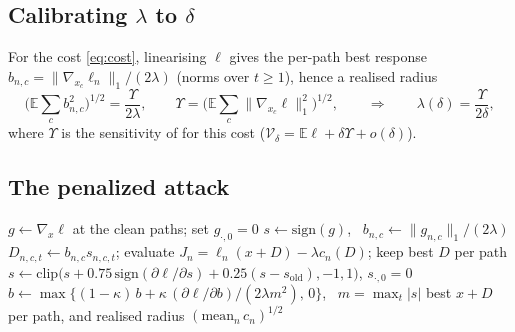 \documentclass[11pt]{article}
\newif\ifshowguides
\newcommand{\guide}[1]{\ifshowguides
  \par\smallskip\noindent\fcolorbox{gray!50}{gray!6}{\parbox{\dimexpr\linewidth-2\fboxsep-2\fboxrule}{\small\itshape\color{gray!80!black}#1}}\par\smallskip\fi}
\newcommand{\E}{\mathbb{E}}
\newcommand{\Ups}{\Upsilon}
\begin{document}
\subsection{Calibrating $\lambda$ to $\delta$}
For the cost \eqref{eq:cost}, linearising $\ell$ gives the per-path best response
$b_{n,c}=\|\nabla_{x_c}\ell_n\|_1/(2\lambda)$ (norms over $t\ge1$), hence a realised radius
\begin{equation}\label{eq:calib}
\Big(\E\textstyle\sum_c b_{n,c}^2\Big)^{1/2}=\frac{\Ups}{2\lambda},\qquad
\Ups=\Big(\E\textstyle\sum_c\|\nabla_{x_c}\ell\|_1^2\Big)^{1/2},
\qquad\Longrightarrow\qquad \lambda(\delta)=\frac{\Ups}{2\delta},
\end{equation}
where $\Ups$ is the sensitivity of \cite{bartl2021} for this cost
($\mathcal{V}_\delta=\E\ell+\delta\Ups+o(\delta)$).
\guide{Derivation in \cref{app:derivation}, including the consistency check that plugging
\eqref{eq:calib} into \eqref{eq:duality} recovers $\E\ell+\delta\Ups$. Calibrate on the clean
network the robust phase starts from; it is a first-order match, verified empirically in
\cref{sec:res-calib}.}

\subsection{The penalized attack}
\begin{algorithm}[htbp]
\caption{Penalized attack for one batch (same parameterisation as \cite{he2025}'s budget attack).}\label{alg:pen}
\begin{algorithmic}[1]
\State $g\gets\nabla_x\ell$ at the clean paths; set $g_{\cdot,0}=0$
\State $s\gets\mathrm{sign}(g)$, \ $b_{n,c}\gets\|g_{n,c}\|_1/(2\lambda)$ 
  \State $D_{n,c,t}\gets b_{n,c}s_{n,c,t}$; evaluate $J_n=\ell_n(x+D)-\lambda c_n(D)$; keep best $D$ per path
  \State $s\gets\mathrm{clip}\big(s+0.75\,\mathrm{sign}(\partial\ell/\partial s)+0.25(s-s_{\mathrm{old}}),-1,1\big)$, $s_{\cdot,0}=0$
  \State $b\gets\max\big\{(1-\kappa)\,b+\kappa\,(\partial\ell/\partial b)/(2\lambda m^2),\,0\big\}$, \ $m=\max_t|s|$
\EndFor
\State \Return best $x+D$ per path, and realised radius $(\mathrm{mean}_n\,c_n)^{1/2}$
\end{algorithmic}
\end{algorithm}
\guide{Convergence (\cref{app:convergence}): if the loss is $\mu$-strongly concave along the
budget, the budget update converges to the optimum iff $\lambda>-\mu/2$, at rate
$1-\kappa(1+\mu/2\lambda)$ per step; below the threshold the inner problem is unbounded. ReLU,
the CVaR kink and the sup-norm cost mean the smoothness assumption of \cite{sinha2018} fails,
so state that no guarantee is claimed and check stability empirically.}
\end{document}
